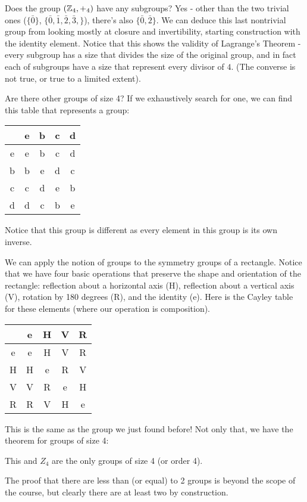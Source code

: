 \documentclass[11pt,twosided]{article}
\begin{document}
Does the group $(\mathbb Z_4, +_4)$ have any subgroups? Yes - other than the two trivial ones ($\{\bar 0\}$, $\{\bar 0, \bar 1,  \bar 2, \bar 3, \}$), there's also $\{ \bar 0, \bar 2\}$. We can deduce this last nontrivial group from looking mostly at closure and invertibility, starting construction with the identity element. 
Notice that this shows the validity of Lagrange's Theorem - every subgroup has a size that divides the size of the original group, and in fact each of subgroups have a size that represent every divisor of $4$. (The converse is not true, or true to a limited extent).

Are there other groups of size 4? If we exhaustively search for one, we can find this table that represents a group: 
\begin{center}
\begin{tabular}{c | c c c c}
 & e & b & c & d \\ \hline 
e & e & b & c & d \\ 
b & b & e & d & c\\ 
c & c & d & e & b \\ 
d & d & c & b & e \\ 
\end{tabular}
\end{center}
Notice that this group is different as every element in this group is its own inverse.

We can apply the notion of groups to the symmetry groups of a rectangle. Notice that we have four basic operations that preserve the shape and orientation of the rectangle: reflection about a horizontal axis (H), reflection about a vertical axis (V), rotation by 180 degrees (R), and the identity (e). Here is the Cayley table for these elements (where our operation is composition). 
\begin{center}
\begin{tabular}{c | c c c c}
 & e & H & V & R \\ \hline 
e & e & H & V & R \\ 
H & H & e & R & V\\ 
V & V & R & e & H \\ 
R & R & V & H & e \\ 
\end{tabular}
\end{center}

This is the same as the group we just found before! Not only that, we have the theorem for groups of size 4: 
\begin{theorem}
This and $Z_4$ are the only groups of size 4 (or order 4).
\end{theorem} 
The proof that there are less than (or equal) to 2 groups is beyond the scope of the course, but clearly there are at least two by construction. 
\end{document}
